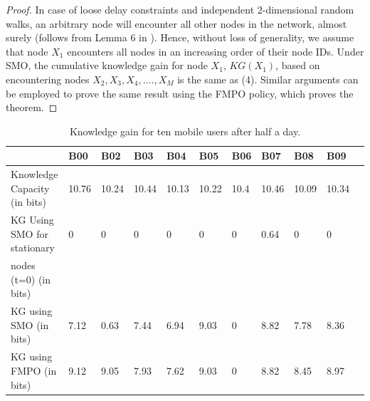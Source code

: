 \documentclass[conference]{IEEEtran}
\theoremstyle{definition}
\begin{document}
\begin{proof}
In case of loose delay constraints and independent 2-dimensional random walks, an arbitrary node will encounter all other nodes in the network, almost surely (follows from Lemma 6 in \cite{elgamal}).
Hence, without loss of generality, we assume that node $X_1$ encounters all nodes in an increasing order of their node IDs. Under SMO, the cumulative knowledge gain for node $X_1$, $KG(X_1)$, based on encountering nodes $X_2, X_3, X_4,...., X_M$ is the same as (4).
Similar arguments can be employed to prove the same result using the FMPO policy, which proves the theorem.
%
\end{proof}
%
\begin{table}
\centering
\caption{Knowledge gain for ten mobile users after half a day.}{} \label{tab:Infocom} 
\begin{tabular}[!tp]{|l|l|l|l|l|l|l|l|l|l|l|}
\hline
       &B00& B02 & B03 & B04 & B05 & B06 & B07 & B08 & B09\\
     

\hline
Knowledge Capacity (in bits) &  10.76& 10.24 & 10.44 &  10.13   & 10.22   &  10.4  &  10.46  & 10.09 &  10.34 \\
\hline
KG Using SMO for stationary   &0  & 0& 0 &0& 0 & 0 & 0.64 &0 &0 \\
nodes (t=0) (in bits)         &   &  &   & &   &   &      &  &  \\
\hline

KG using SMO (in bits)  &7.12  & 0.63& 7.44 &6.94& 9.03 & 0 & 8.82 &7.78 &8.36 \\
\hline
KG using FMPO (in bits) & 9.12 &9.05	&	7.93&	7.62&	9.03	&0	&8.82	&			8.45	&		    8.97\\
     

\hline
\end{tabular}
\end{table}
\vspace{-1 cm}
\end{document}
